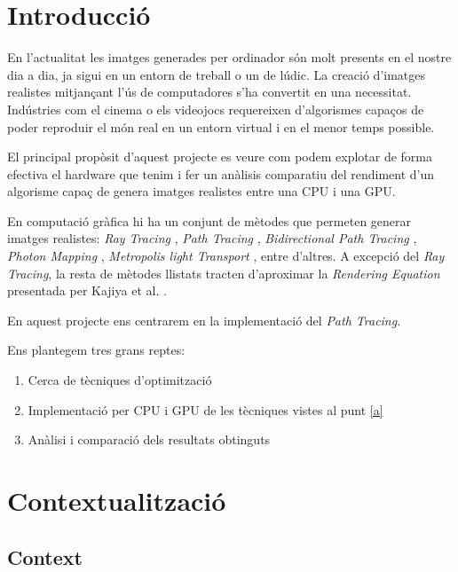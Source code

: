 \documentclass[a4paper,titlepage]{article}
\begin{document}
\iftrue

\newpage
\tableofcontents*
\fi

\newpage

\section{Introducció}

En l'actualitat les imatges generades per ordinador són molt presents en el nostre dia a dia, ja sigui en un entorn de treball o un de lúdic. La creació d'imatges realistes mitjançant l'ús de computadores s'ha convertit en una necessitat. Indústries com el cinema o els videojocs requereixen d'algorismes capaços de poder reproduir el món real en un entorn virtual i en el menor temps possible.

El principal propòsit d'aquest projecte es veure com podem explotar de forma efectiva el hardware que tenim i fer un anàlisis comparatiu del rendiment d'un algorisme capaç de genera imatges realistes entre una CPU i una GPU. 

En computació gràfica hi ha un conjunt de mètodes que permeten generar imatges realistes: \textit{Ray Tracing} \cite{Whitted1980}, \textit{Path Tracing} \cite{Kajiya1986}, \textit{Bidirectional Path Tracing} \cite{Lafortune1993}, \textit{Photon Mapping} \cite{Jensen1996}, \textit{Metropolis light Transport} \cite{Veach1997}, entre d'altres. A excepció del \textit{Ray Tracing}, la resta de mètodes llistats tracten d'aproximar la \textit{Rendering Equation} presentada per Kajiya et al. \cite{Kajiya1986}. 

En aquest projecte ens centrarem en la implementació del \textit{Path Tracing}.

Ens plantegem tres grans reptes:

\begin{enumerate}
	\item \label{a} Cerca de tècniques d'optimització
	\item Implementació per CPU i GPU de les tècniques vistes al punt \ref{a}
	\item Anàlisi i comparació dels resultats obtinguts
\end{enumerate}

\newpage

\section{Contextualització}

\subsection{Context}
\end{document}

